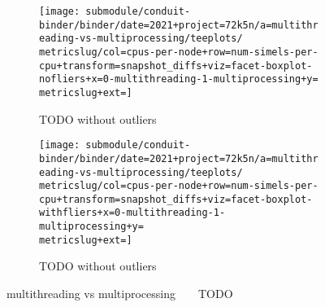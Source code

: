 \begin{figure*}
  \centering
  \begin{subfigure}[b]{0.5\textwidth}
    \centering
    \texttt{[image: submodule/conduit-binder/binder/date=2021+project=72k5n/a=multithreading-vs-multiprocessing/teeplots/\\metricslug/col=cpus-per-node+row=num-simels-per-cpu+transform=snapshot\_diffs+viz=facet-boxplot-nofliers+x=0-multithreading-1-multiprocessing+y=\\metricslug+ext=]}
    \caption{TODO without outliers}
    \label{fig:multithreading-vs-multiprocessing-distribution-\metricslug-nofliers}
  \end{subfigure}%
  \begin{subfigure}[b]{0.5\textwidth}
    \centering
    \texttt{[image: submodule/conduit-binder/binder/date=2021+project=72k5n/a=multithreading-vs-multiprocessing/teeplots/\\metricslug/col=cpus-per-node+row=num-simels-per-cpu+transform=snapshot\_diffs+viz=facet-boxplot-withfliers+x=0-multithreading-1-multiprocessing+y=\\metricslug+ext=]}
    \caption{TODO without outliers}
    \label{fig:multithreading-vs-multiprocessing-distribution-\metricslug-withfliers}
  \end{subfigure}
  \caption{multithreading vs multiprocessing ~ \metric ~ TODO}
  \label{fig:multithreading-vs-multiprocessing-distribution-\metricslug}
\end{figure*}
